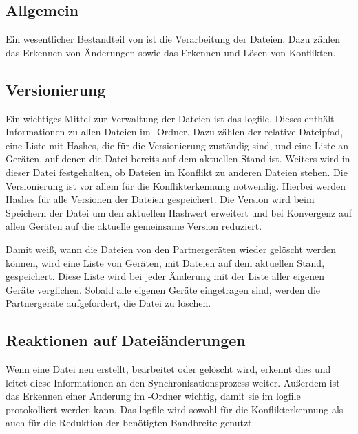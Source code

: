 \subsection{Allgemein}
Ein wesentlicher Bestandteil von \sblit ist die Verarbeitung der Dateien. Dazu zählen das Erkennen von Änderungen sowie das Erkennen und Lösen von Konflikten.
\subsection{Versionierung}\label{Logfile}
Ein wichtiges Mittel zur Verwaltung der Dateien ist das \gls{logfile}. Dieses enthält Informationen zu allen Dateien im \sblit-Ordner. Dazu zählen der relative Dateipfad, eine Liste mit Hashes, die für die Versionierung zuständig sind, und eine Liste an Geräten, auf denen die Datei bereits auf dem aktuellen Stand ist. Weiters wird in dieser Datei festgehalten, ob Dateien im Konflikt zu anderen Dateien stehen. Die Versionierung ist vor allem für die Konflikterkennung  notwendig. Hierbei werden Hashes für alle Versionen der Dateien gespeichert. Die Version wird beim Speichern der Datei um den aktuellen Hashwert erweitert und bei Konvergenz auf allen Geräten auf die aktuelle gemeinsame Version reduziert. 

Damit \sblit weiß, wann die Dateien von den Partnergeräten  wieder gelöscht werden können, wird eine Liste von Geräten, mit Dateien auf dem aktuellen Stand, gespeichert. Diese Liste wird bei jeder Änderung mit der Liste aller eigenen Geräte verglichen. Sobald alle eigenen Geräte eingetragen sind, werden die Partnergeräte aufgefordert, die Datei zu löschen. 

\subsection{Reaktionen auf Dateiänderungen}
Wenn eine Datei neu erstellt, bearbeitet oder gelöscht wird, erkennt dies \sblit und leitet diese Informationen an den Synchronisationsprozess weiter. Außerdem ist das Erkennen einer Änderung im \sblit-Ordner wichtig, damit sie im \gls{logfile} protokolliert werden kann. Das \gls{logfile} wird sowohl für die Konflikterkennung  als auch für die Reduktion der benötigten Bandbreite  genutzt.

